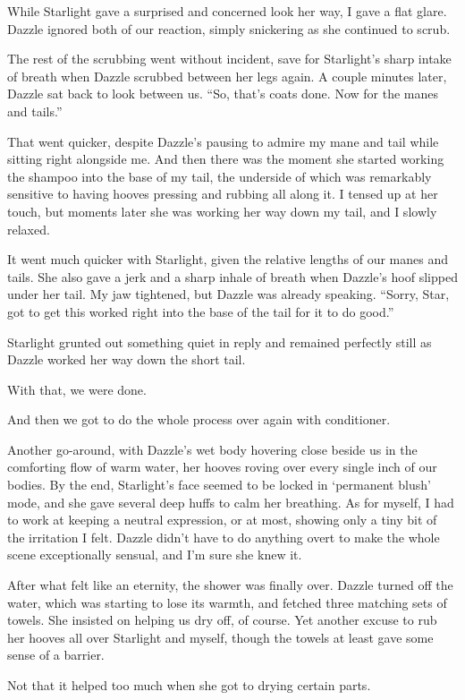 While Starlight gave a surprised and concerned look her way, I gave a flat glare. Dazzle ignored both of our reaction, simply snickering as she continued to scrub.

The rest of the scrubbing went without incident, save for Starlight’s sharp intake of breath when Dazzle scrubbed between her legs again. A couple minutes later, Dazzle sat back to look between us. “So, that’s coats done. Now for the manes and tails.”

That went quicker, despite Dazzle’s pausing to admire my mane and tail while sitting right alongside me. And then there was the moment she started working the shampoo into the base of my tail, the underside of which was remarkably sensitive to having hooves pressing and rubbing all along it. I tensed up at her touch, but moments later she was working her way down my tail, and I slowly relaxed.

It went much quicker with Starlight, given the relative lengths of our manes and tails. She also gave a jerk and a sharp inhale of breath when Dazzle’s hoof slipped under her tail. My jaw tightened, but Dazzle was already speaking. “Sorry, Star, got to get this worked right into the base of the tail for it to do good.”

Starlight grunted out something quiet in reply and remained perfectly still as Dazzle worked her way down the short tail.

With that, we were done.

And then we got to do the whole process over again with conditioner.

Another go-around, with Dazzle’s wet body hovering close beside us in the comforting flow of warm water, her hooves roving over every single inch of our bodies. By the end, Starlight’s face seemed to be locked in ‘permanent blush’ mode, and she gave several deep huffs to calm her breathing. As for myself, I had to work at keeping a neutral expression, or at most, showing only a tiny bit of the irritation I felt. Dazzle didn’t have to do anything overt to make the whole scene exceptionally sensual, and I’m sure she knew it.

After what felt like an eternity, the shower was finally over. Dazzle turned off the water, which was starting to lose its warmth, and fetched three matching sets of towels. She insisted on helping us dry off, of course. Yet another excuse to rub her hooves all over Starlight and myself, though the towels at least gave some sense of a barrier.

Not that it helped too much when she got to drying certain parts.

